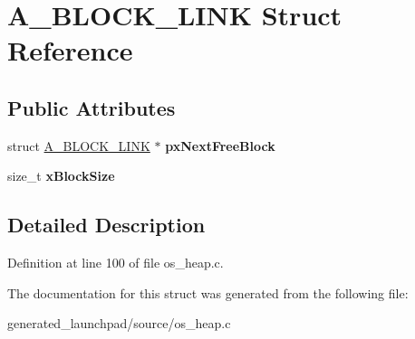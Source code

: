 \hypertarget{structA__BLOCK__LINK}{}\section{A\+\_\+\+B\+L\+O\+C\+K\+\_\+\+L\+I\+NK Struct Reference}
\label{structA__BLOCK__LINK}
\subsection*{Public Attributes}
\begin{DoxyCompactItemize}
\item 
\mbox{\label{structA__BLOCK__LINK_a005de4303d4b4e61065e77d97c9774fe}} 
struct \mbox{\hyperlink{structA__BLOCK__LINK}{A\+\_\+\+B\+L\+O\+C\+K\+\_\+\+L\+I\+NK}} $\ast$ {\bfseries px\+Next\+Free\+Block}
\item 
\mbox{\label{structA__BLOCK__LINK_ad5dcf5df03d8be6186c567be9e2c657b}} 
size\+\_\+t {\bfseries x\+Block\+Size}
\end{DoxyCompactItemize}


\subsection{Detailed Description}


Definition at line 100 of file os\+\_\+heap.\+c.



The documentation for this struct was generated from the following file\+:\begin{DoxyCompactItemize}
\item 
generated\+\_\+launchpad/source/os\+\_\+heap.\+c\end{DoxyCompactItemize}
